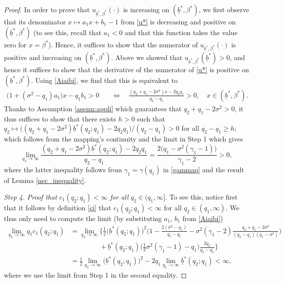 \documentclass[11pt]{article} %
\def\ub{\underline{b}}
\numberwithin{komcounter}{section}
\begin{document}
\begin{proof}
In order to prove that $u_{\ub^*,\beta^*}(\cdot)$ is increasing on $(\ub^*,\beta^*)$, we first observe that its denominator $x \mapsto a_1 x + b_1 - 1$ from \eqref{u*} is decreasing and positive on $(\ub^*,\beta^*)$ 
(to see this, recall that $a_1<0$ and that this function takes the value zero for $x=\beta ^*$). 
Hence, it suffices to show that the numerator of $u_{\ub^*,\beta^*}(\cdot)$ is positive and increasing on $(\ub^*,\beta^*)$.  Above we showed that $u_{\ub^*,\beta^*}(\ub^*)>0$, and hence it suffices to show that the derivative of the numerator of \eqref{u*}  is  positive on  $(\ub^*,\beta^*)$. Using \eqref{Aiaibi}, we find that this is equivalent to 
\begin{align*} 
\big(1 + (\sigma^2 - q_1) a_1 \big) x - q_1 b_1 > 0 
&\quad \Leftrightarrow \quad 
\frac{(q_2 + q_1 - 2 \sigma^2) x - 2 q_2 q_1}{q_2 - q_1} > 0 , 
\quad x \in (\ub^*,\beta^*).
\end{align*}
Thanks to Assumption \ref{assum:appli} which guarantees that $q_2 + q_1 - 2 \sigma^2>0$, it thus suffices to show that there exists $h>0$ such that $q_2 \mapsto \big((q_2 + q_1 - 2 \sigma^2)\ub^*(q_2;q_1) - 2 q_2 q_1 \big)/(q_2 - q_1) > 0$ for all $q_2-q_1\geq h$; which follows from the mapping's continuity and the limit in Step 1 which gives
$$
\lim_{q_2 \to \infty} \frac{(q_2 + q_1 - 2 \sigma^2)\ub^*(q_2;q_1) - 2 q_2 q_1}{q_2 - q_1} = \frac{2 \big(q_1 - \sigma^2(\gamma_1 - 1)\big)}{\gamma_1 - 2} > 0,
$$
where the latter inequality follows from $\gamma_1 = \gamma(q_1)$ in \eqref{gammaq} and the result of Lemma \ref{nec_inequality}.

\vspace{1mm}
{\it Step 4. Proof that $c_1(q_2;q_1) <\infty$ for all $q_2 \in (q_1, \infty]$}.
To see this, notice first that it follows by definition \eqref{ci} that $c_1(q_2;q_1) <\infty$ for all $q_2 \in (q_1, \infty)$. 
We thus only need to compute the limit (by substituting $a_1$, $b_1$ from \eqref{Aiaibi}) 
\begin{align*}
\lim_{q_2 \to \infty} q_1 c_1(q_2;q_1) 
&= \lim_{q_2 \to \infty} \bigg\{ 
\tfrac12 \big(\ub^*(q_2;q_1)\big)^2 \Big(1 - \frac{2(\sigma^2 - q_1)}{q_2-q_1} - \sigma^2 (\gamma_1 - 2) \frac{q_2 + q_1 - 2\sigma^2}{(q_2-q_1)(q_1-\sigma^2)} \Big) \\
&\qquad \qquad \;+ \ub^*(q_2;q_1) \big( \tfrac12 \sigma^2 (\gamma_1 - 1) - q_1 \big) \frac{2 q_2}{q_2-q_1} 
\bigg\}\\
&= \tfrac12 \lim_{q_2 \to \infty} \big(\ub^*(q_2;q_1)\big)^2 - 2 q_1 \lim_{q_2 \to \infty} \ub^*(q_2;q_1) 
<\infty,     
\end{align*}
where we use the limit from Step 1 in the second equality.


\end{proof}
\end{document}
